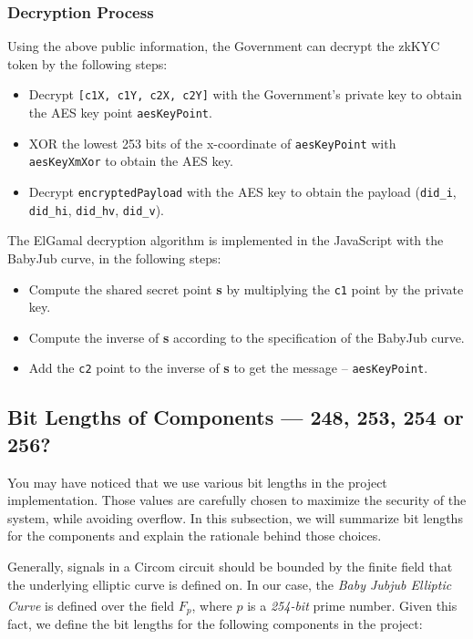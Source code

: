 \documentclass[
]{report}
\providecommand{\tightlist}{%
  \setlength{\itemsep}{0pt}\setlength{\parskip}{0pt}}
\begin{document}
\subsubsection{Decryption Process}

Using the above public information, the Government can decrypt the zkKYC
token by the following steps:

\begin{itemize}
\tightlist
\item
  Decrypt \texttt{{[}c1X,\ c1Y,\ c2X,\ c2Y{]}} with the Government's
  private key to obtain the AES key point \texttt{aesKeyPoint}.
\item
  XOR the lowest 253 bits of the x-coordinate of \texttt{aesKeyPoint}
  with \texttt{aesKeyXmXor} to obtain the AES key.
\item
  Decrypt \texttt{encryptedPayload} with the AES key to obtain the
  payload (\texttt{did\_i}, \texttt{did\_hi}, \texttt{did\_hv},
  \texttt{did\_v}).
\end{itemize}

The ElGamal decryption algorithm is implemented in the JavaScript
with the BabyJub curve, in the following steps:
\begin{itemize}
  \tightlist
  \item Compute the shared secret point \textbf{s} by multiplying the
    \texttt{c1} point by the private key.
  \item Compute the inverse of \textbf{s} according to the
    specification of the BabyJub curve.
  \item Add the \texttt{c2} point to the inverse of \textbf{s} to get
    the message -- \texttt{aesKeyPoint}.
\end{itemize}
  
  
\subsection{Bit Lengths of Components --- 248, 253, 254 or 256?}

You may have noticed that we use various bit lengths in the project
implementation. Those values are carefully chosen to maximize the
security of the system, while avoiding overflow. In this subsection, we
will summarize bit lengths for the components and explain the rationale
behind those choices.

Generally, signals in a Circom circuit should be bounded by the finite
field that the underlying elliptic curve is defined on. In our case, the
\emph{Baby Jubjub Elliptic Curve} is defined over the field \(F_p\),
where \(p\) is a \emph{254-bit} prime
number\textsuperscript{\cite{EIP2494}}. Given
this fact, we define the bit lengths for the following components in the
project:
\end{document}
